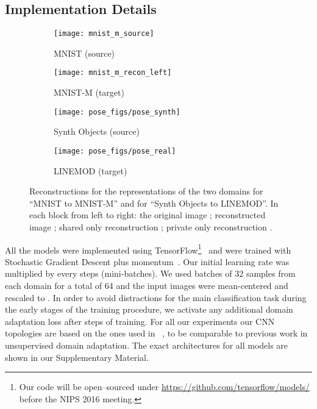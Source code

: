 \documentclass{article}
\begin{document}
\subsection{Implementation Details}
\begin{figure}[t]
    \centering
\begin{subfigure}[b]{.23\linewidth}
        \centering
        \texttt{[image: mnist\_m\_source]}
        \caption{MNIST (source)}
        \label{fig:mnist_to_mnist-m_source}
    \end{subfigure}          \hfill
    \begin{subfigure}[b]{.23\linewidth}
        \centering
    \texttt{[image: mnist\_m\_recon\_left]}
        \caption{MNIST-M (target)}
        \label{fig:mnist_to_mnist-m_target}
    \end{subfigure}          \hfill
    \begin{subfigure}[b]{.23\linewidth}
        \centering
        \texttt{[image: pose\_figs/pose\_synth]}
        \caption{Synth Objects (source)}
        \label{fig:mnist_to_mnist-m_target}
    \end{subfigure}          \hfill
    \begin{subfigure}[b]{.23\linewidth}
        \centering
        \texttt{[image: pose\_figs/pose\_real]}
        \caption{LINEMOD (target)}
        \label{fig:mnist_to_mnist-m_target}
    \end{subfigure}          \hfill    
    \caption{Reconstructions for the representations of the two domains for ``MNIST to MNIST-M'' and for ``Synth Objects to LINEMOD''. In each block from left to right: the original image ; reconstructed image ; shared only reconstruction  ;  private only reconstruction  .}
    \label{fig:mnist_m_visualizations}
\end{figure}
All the models were implemented using TensorFlow\footnote{Our code will be open--sourced under \url{https://github.com/tensorflow/models/} before the NIPS 2016 meeting.}~\cite{abadi2016tensorflow} and were trained with Stochastic Gradient Descent plus momentum~\cite{sutskever2013momentum}. Our initial learning rate was multiplied by  every  steps (mini-batches). We used batches of 32 samples from each domain for a total of 64 and
the input images were mean-centered and rescaled to .
In order to avoid distractions for the main classification task during the early stages of the training procedure, we activate any additional domain adaptation loss after  steps of training. 
For all our experiments our CNN topologies are based on the ones used in ~\cite{ganin2016domain}, to be comparable to previous work in unsupervised domain adaptation. The exact architectures for all models are shown in our Supplementary Material. 
\end{document}

